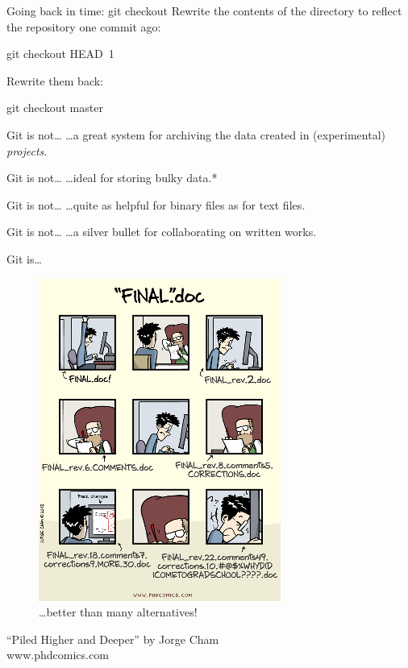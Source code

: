 \begin{frame}[fragile]{Going back in time: git checkout}
  Rewrite the contents of the directory to reflect the repository one commit
  ago:

  \begin{gitCommand}git checkout HEAD~1\end{gitCommand}

  Rewrite them back:

  \begin{gitCommand}git checkout master\end{gitCommand}

\end{frame}

\begin{frame}{Git is not\ldots}
  \hangindent=30pt \Huge {
  \ldots a great system for archiving the data created in (experimental)
  \emph{projects}.
  }
\end{frame}

\begin{frame}{Git is not\ldots}
  \hangindent=30pt \Huge {
  \ldots ideal for storing bulky data.*
  }
\end{frame}

\begin{frame}{Git is not\ldots}
  \hangindent=30pt \Huge {
  \ldots quite as helpful for binary files as for text files.
  }
\end{frame}

\begin{frame}{Git is not\ldots}
  \hangindent=30pt \Huge {
  \ldots a silver bullet for collaborating on written works.
  }
\end{frame}

\begin{frame}{Git is\ldots}
  \begin{figure}
    \includegraphics[scale=0.5]{phd101212s.png}
    \\ \ldots better than many alternatives!
  \end{figure}
  \footnotesize{``Piled Higher and Deeper'' by Jorge Cham\\
    www.phdcomics.com}

\end{frame}


